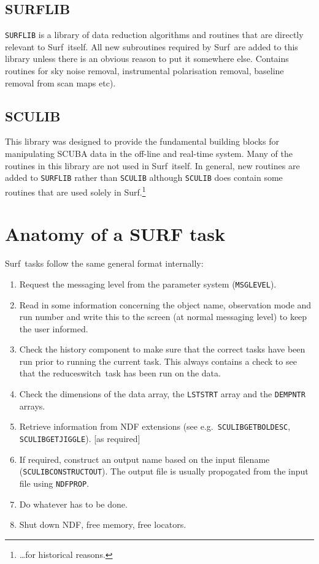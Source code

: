 \documentclass[twoside,11pt]{article}
\newcommand{\task}[1]{{\sf #1}}
\newcommand{\param}[1]{{\tt #1}}
\newcommand{\resw}{\xref{\task{reduce\_switch}}{sun216}{REDUCE_SWITCH}}
\newcommand{\scusoft}          {{\sc Surf}}
\newcommand{\xref}[3]{#1}
\renewcommand{\_}{\texttt{\symbol{95}}}
\begin{document}
\subsection{SURFLIB}

\texttt{SURFLIB} is a library of data reduction algorithms and routines that
are directly relevant to \scusoft\ itself. All new subroutines required by
\scusoft\ are added to this library unless there is an obvious reason to put
it somewhere else. Contains routines for sky noise removal, instrumental
polarisation removal, baseline removal from scan maps etc).


\subsection{SCULIB}

This library was designed to provide the fundamental building blocks for
manipulating SCUBA data in the off-line and real-time system. Many of the
routines in this library are not used in \scusoft\ itself. In general,
new routines are added to \texttt{SURFLIB} rather than \texttt{SCULIB}
although \texttt{SCULIB} does contain some routines that are used solely in 
\scusoft.\footnote{\ldots for historical reasons.}


\section{Anatomy of a SURF task}

\scusoft\ tasks follow the same general format internally:

\begin{enumerate}
\item Request the messaging level from the parameter system
(\param{MSG\_LEVEL}).
\item Read in some information concerning the object name, observation mode
and run number and write this to the screen (at normal messaging level) to
keep the user informed.
\item Check the history component to make sure that the correct tasks have
been run prior to running the current task. This always contains a check to
see that the \resw\ task has been run on the data.
\item Check the dimensions of the data array, the \texttt{LST\_STRT} array and
the \texttt{DEM\_PNTR} arrays.
\item Retrieve information from NDF extensions (see e.g.\ 
\texttt{SCULIB\_GET\_BOL\_DESC}, \texttt{SCULIB\_GET\_JIGGLE}). [as required]
\item If required, construct an output name based on the input filename
(\texttt{SCULIB\_CONSTRUCT\_OUT}). The output file is usually propogated from
the input file using \texttt{NDF\_PROP}.
\item Do whatever has to be done.
\item Shut down NDF, free memory, free locators.

\end{enumerate}
\end{document}
